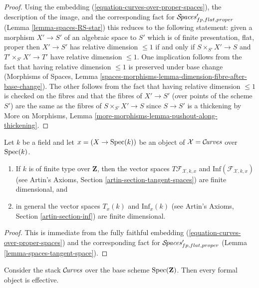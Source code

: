 \begin{proof}
Using the embedding (\ref{equation-curves-over-proper-spaces}),
the description of the image, and
the corresponding fact for $\mathcal{S}\!\mathit{paces}'_{fp, flat, proper}$
(Lemma \ref{lemma-spaces-RS-star})
this reduces to the following statement:
given a morphism $X' \to S'$ of an algebraic space to $S'$
which is of finite presentation, flat, proper then
$X' \to S'$ has relative dimension $\leq 1$
if and only if $S \times_{S'} X' \to S$
and $T' \times_{S'} X' \to T'$ have relative dimension $\leq 1$.
One implication follows from the fact that
having relative dimension $\leq 1$ is preserved under base change
(Morphisms of Spaces, Lemma
\ref{spaces-morphisms-lemma-dimension-fibre-after-base-change}).
The other follows from the fact that having relative
dimension $\leq 1$ is checked on the fibres and that
the fibres of $X' \to S'$ (over points of the scheme $S'$)
are the same as the fibres of $S \times_{S'} X' \to S$
since $S \to S'$ is a thickening by
More on Morphisms, Lemma \ref{more-morphisms-lemma-pushout-along-thickening}.
\end{proof}

\begin{lemma}
\label{lemma-curves-tangent-space}
Let $k$ be a field and let $x = (X \to \mathop{\mathrm{Spec}}(k))$ be an object of
$\mathcal{X} = \mathcal{C}\!\mathit{urves}$ over $\mathop{\mathrm{Spec}}(k)$.
\begin{enumerate}
\item If $k$ is of finite type over $\mathbf{Z}$, then
the vector spaces $T\mathcal{F}_{\mathcal{X}, k, x}$ and
$\text{Inf}(\mathcal{F}_{\mathcal{X}, k, x})$
(see Artin's Axioms, Section \ref{artin-section-tangent-spaces})
are finite dimensional, and
\item in general the vector spaces $T_x(k)$ and $\text{Inf}_x(k)$
(see Artin's Axioms, Section \ref{artin-section-inf})
are finite dimensional.
\end{enumerate}
\end{lemma}

\begin{proof}
This is immediate from the fully faithful embedding
(\ref{equation-curves-over-proper-spaces}) and
the corresponding fact for $\mathcal{S}\!\mathit{paces}'_{fp, flat, proper}$
(Lemma \ref{lemma-spaces-tangent-space}).
\end{proof}

\begin{lemma}
\label{lemma-curves-existence}
Consider the stack $\mathcal{C}\!\mathit{urves}$ over the base
scheme $\mathop{\mathrm{Spec}}(\mathbf{Z})$. Then every formal object is effective.
\end{lemma}

